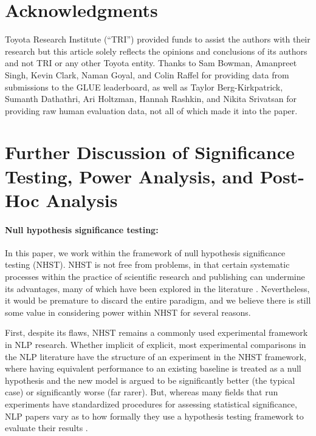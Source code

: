 \documentclass[11pt,a4paper]{article}
\begin{document}
\section*{Acknowledgments}

Toyota Research Institute (``TRI'')  provided funds to assist the authors with their research but this article solely reflects the opinions and conclusions of its authors and not TRI or any other Toyota entity. Thanks to Sam Bowman, Amanpreet Singh, Kevin Clark, Naman Goyal, and Colin Raffel for providing data from submissions to the GLUE leaderboard, as well as Taylor Berg-Kirkpatrick, Sumanth Dathathri, Ari Holtzman, Hannah Rashkin, and Nikita Srivatsan for providing raw human evaluation data, not all of which made it into the paper.


%



\newpage
\appendix

\section{Further Discussion of Significance Testing, Power Analysis, and Post-Hoc Analysis}
\label{app:nhst}

\paragraph{Null hypothesis significance testing:}
In this paper, we work within the framework of null hypothesis significance testing (NHST). NHST is not free from problems, in that certain systematic processes within the practice of scientific research and publishing can undermine its advantages, many of which have been explored in the literature \citep{gelman.2013,ioannidis.2019,mcshane.2019}.
Nevertheless, it would be premature to discard the entire paradigm, and we believe there is still some value in considering power within NHST for several reasons.

First, despite its flaws, NHST remains a commonly used experimental framework in NLP research. 
Whether implicit of explicit, most experimental comparisons in the NLP literature have the structure of an experiment in the NHST framework, where having equivalent performance to an existing baseline is treated as a null hypothesis and the new model is argued to be significantly better (the typical case) or significantly worse (far rarer). But, whereas many fields that run experiments have standardized procedures for assessing statistical significance, NLP papers vary as to how formally they use a hypothesis testing framework to evaluate their results \cite{berg.2012,van2019best,azer.2020}. 
\end{document}
